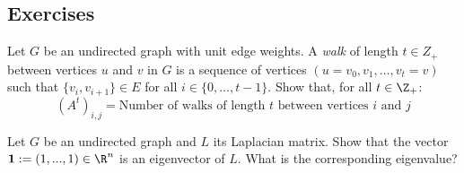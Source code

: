 \subsection{Exercises}

%
%
% 


\begin{exercise}
Let $G$ be an undirected graph with unit edge weights.  A \emph{walk} of length $t \in Z_+$ between vertices $u$ and $v$ in $G$ is a sequence of vertices $(u=v_0, v_1, \ldots, v_t=v)$ such that $\{v_i, v_{i+1}\} \in E$ for all $i \in \{0,\ldots, t-1\}.$ 
Show that, for all $t \in \Z_+$: 
$$
(A^t)_{i,j} = \textrm{Number of walks of length $t$ between vertices $i$ and $j$}
$$
\end{exercise}
\begin{exercise}
Let $G$ be an undirected graph and $L$ its Laplacian matrix. Show that the vector $\mathbf{1}:= (1, ... , 1) \in \R^n$ is an eigenvector of $L$. What is the corresponding eigenvalue?
\end{exercise}
